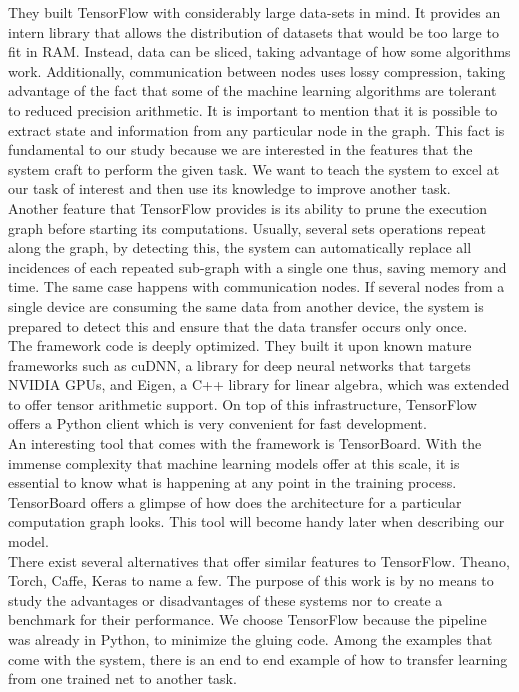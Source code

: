 They built TensorFlow with considerably large data-sets in mind. It provides an intern library that allows the distribution of datasets that would be too large to fit in RAM. Instead, data can be sliced, taking advantage of how some algorithms work. Additionally, communication between nodes uses lossy compression, taking advantage of the fact that some of the machine learning algorithms are tolerant to reduced precision arithmetic. It is important to mention that it is possible to extract state and information from any particular node in the graph. This fact is fundamental to our study because we are interested in the features that the system craft to perform the given task. We want to teach the system to excel at our task of interest and then use its knowledge to improve another task.\\

Another feature that TensorFlow provides is its ability to prune the execution graph before starting its computations. Usually, several sets operations repeat along the graph, by detecting this, the system can automatically replace all incidences of each repeated sub-graph with a single one thus, saving memory and time. The same case happens with communication nodes. If several nodes from a single device are consuming the same data from another device, the system is prepared to detect this and ensure that the data transfer occurs only once.\\

The framework code is deeply optimized. They built it upon known mature frameworks such as cuDNN, a library for deep neural networks that targets NVIDIA GPUs, and Eigen, a C++ library for linear algebra, which was extended to offer tensor arithmetic support. On top of this infrastructure, TensorFlow offers a Python client which is very convenient for fast development.\\

An interesting tool that comes with the framework is TensorBoard. With the immense complexity that machine learning models offer at this scale, it is essential to know what is happening at any point in the training process. TensorBoard offers a glimpse of how does the architecture for a particular computation graph looks. This tool will become handy later when describing our model.\\

There exist several alternatives that offer similar features to TensorFlow. Theano, Torch, Caffe, Keras to name a few. The purpose of this work is by no means to study the advantages or disadvantages of these systems nor to create a benchmark for their performance. We choose TensorFlow because the pipeline was already in Python,  to minimize the gluing code. Among the examples that come with the system, there is an end to end example of how to transfer learning from one trained net to another task.\\











